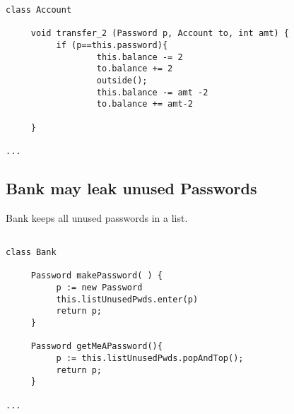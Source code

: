 \begin{lstlisting}[language=chainmail, mathescape=true, frame=lines]
class Account

     void transfer_2 (Password p, Account to, int amt) {
          if (p==this.password){
                  this.balance -= 2
                  to.balance += 2
                  outside();
                  this.balance -= amt -2
                  to.balance += amt-2
                     
     }
     
...
\end{lstlisting}

\subsection{Bank may leak unused Passwords}

Bank keeps all unused passwords in a list. 

\begin{lstlisting}[language=chainmail, mathescape=true, frame=lines]

class Bank

     Password makePassword( ) {
          p := new Password
          this.listUnusedPwds.enter(p) 
          return p;                    
     }
     
     Password getMeAPassword(){
          p := this.listUnusedPwds.popAndTop();
          return p;
     }
     
...
\end{lstlisting}
